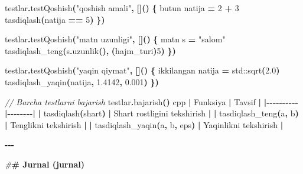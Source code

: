 \documentclass[a4paper,11pt,twoside,openright]{book}
\newenvironment{Shaded}{\begin{snugshade}}{\end{snugshade}}
\newcommand{\BuiltInTok}[1]{#1}
\newcommand{\CommentTok}[1]{\textcolor[rgb]{0.56,0.35,0.01}{\textit{#1}}}
\newcommand{\DecValTok}[1]{\textcolor[rgb]{0.00,0.00,0.81}{#1}}
\newcommand{\ErrorTok}[1]{\textcolor[rgb]{0.64,0.00,0.00}{\textbf{#1}}}
\newcommand{\FloatTok}[1]{\textcolor[rgb]{0.00,0.00,0.81}{#1}}
\newcommand{\NormalTok}[1]{#1}
\newcommand{\OperatorTok}[1]{\textcolor[rgb]{0.81,0.36,0.00}{\textbf{#1}}}
\newcommand{\PreprocessorTok}[1]{\textcolor[rgb]{0.56,0.35,0.01}{\textit{#1}}}
\newcommand{\StringTok}[1]{\textcolor[rgb]{0.31,0.60,0.02}{#1}}
\begin{document}
\begin{Shaded}
\begin{Highlighting}[]
\NormalTok{testlar}\OperatorTok{.}\NormalTok{testQoshish}\OperatorTok{(}\StringTok{"qo\textquotesingle{}shish amali"}\OperatorTok{,} \OperatorTok{[]()} \OperatorTok{\{}
\NormalTok{    butun natija }\OperatorTok{=} \DecValTok{2} \OperatorTok{+} \DecValTok{3}
\NormalTok{    tasdiqlash}\OperatorTok{(}\NormalTok{natija }\OperatorTok{==} \DecValTok{5}\OperatorTok{)}
\OperatorTok{\})}

\NormalTok{testlar}\OperatorTok{.}\NormalTok{testQoshish}\OperatorTok{(}\StringTok{"matn uzunligi"}\OperatorTok{,} \OperatorTok{[]()} \OperatorTok{\{}
\NormalTok{    matn s }\OperatorTok{=} \StringTok{"salom"}
\NormalTok{    tasdiqlash\_teng}\OperatorTok{(}\NormalTok{s}\OperatorTok{.}\NormalTok{uzunlik}\OperatorTok{(),} \OperatorTok{(}\NormalTok{hajm\_turi}\OperatorTok{)}\DecValTok{5}\OperatorTok{)}
\OperatorTok{\})}

\NormalTok{testlar}\OperatorTok{.}\NormalTok{testQoshish}\OperatorTok{(}\StringTok{"yaqin qiymat"}\OperatorTok{,} \OperatorTok{[]()} \OperatorTok{\{}
\NormalTok{    ikkilangan natija }\OperatorTok{=} \BuiltInTok{std::}\NormalTok{sqrt}\OperatorTok{(}\FloatTok{2.0}\OperatorTok{)}
\NormalTok{    tasdiqlash\_yaqin}\OperatorTok{(}\NormalTok{natija}\OperatorTok{,} \FloatTok{1.4142}\OperatorTok{,} \FloatTok{0.001}\OperatorTok{)}
\OperatorTok{\})}

\CommentTok{// Barcha testlarni bajarish}
\NormalTok{testlar}\OperatorTok{.}\NormalTok{bajarish}\OperatorTok{()}
\ErrorTok{\textasciigrave{}\textasciigrave{}\textasciigrave{}}\NormalTok{cpp}
\OperatorTok{|}\NormalTok{ Funksiya }\OperatorTok{|}\NormalTok{ Tavsif }\OperatorTok{|}
\OperatorTok{|{-}{-}{-}{-}{-}{-}{-}{-}{-}{-}|{-}{-}{-}{-}{-}{-}{-}{-}|}
\OperatorTok{|} \ErrorTok{\textasciigrave{}}\NormalTok{tasdiqlash}\OperatorTok{(}\NormalTok{shart}\OperatorTok{)}\ErrorTok{\textasciigrave{}} \OperatorTok{|}\NormalTok{ Shart rostligini tekshirish }\OperatorTok{|}
\OperatorTok{|} \ErrorTok{\textasciigrave{}}\NormalTok{tasdiqlash\_teng}\OperatorTok{(}\NormalTok{a}\OperatorTok{,}\NormalTok{ b}\OperatorTok{)}\ErrorTok{\textasciigrave{}} \OperatorTok{|}\NormalTok{ Tenglikni tekshirish }\OperatorTok{|}
\OperatorTok{|} \ErrorTok{\textasciigrave{}}\NormalTok{tasdiqlash\_yaqin}\OperatorTok{(}\NormalTok{a}\OperatorTok{,}\NormalTok{ b}\OperatorTok{,}\NormalTok{ eps}\OperatorTok{)}\ErrorTok{\textasciigrave{}} \OperatorTok{|}\NormalTok{ Yaqinlikni tekshirish }\OperatorTok{|}

\OperatorTok{{-}{-}{-}}

\PreprocessorTok{\#}\ErrorTok{\# Jurnal (\textasciigrave{}jurnal\textasciigrave{})}


\end{Highlighting}
\end{Shaded}
\end{document}

